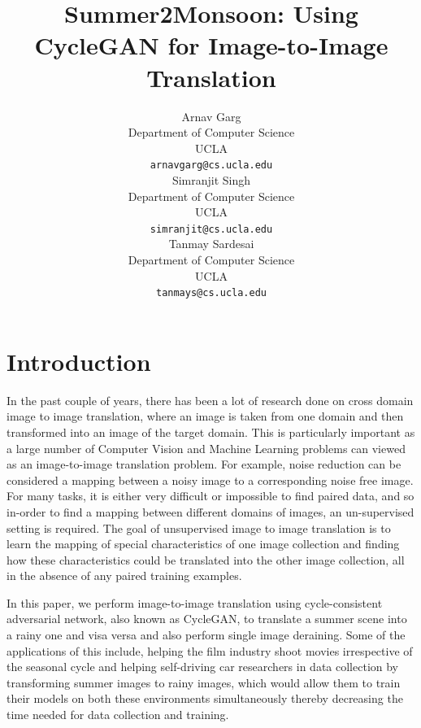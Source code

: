 \documentclass{article}
\title{Summer2Monsoon: Using CycleGAN for Image-to-Image Translation}
\author{
  Arnav Garg \\
  Department of Computer Science\\
  UCLA\\
  \texttt{arnavgarg@cs.ucla.edu} \\
  \And
  Simranjit Singh \\
  Department of Computer Science\\
  UCLA\\
  \texttt{simranjit@cs.ucla.edu} \\
   \And
  Tanmay Sardesai \\
  Department of Computer Science\\
  UCLA\\
  \texttt{tanmays@cs.ucla.edu} \\
}
\begin{document}

\maketitle

\begin{abstract}
 


\end{abstract}

\section{Introduction}

In the past couple of years, there has been a lot of research done on cross domain image to image translation, where an image is taken from one domain and then transformed into an image of the target domain. This is particularly important as a large number of Computer Vision and Machine Learning problems can viewed as an image-to-image translation problem. For example, noise reduction can be considered a mapping between a noisy image to a corresponding noise free image. For many tasks, it is either very difficult or impossible to find paired data, and so in-order to find a mapping between different domains of images, an un-supervised setting is required. The goal of unsupervised image to image translation is to learn the mapping of special characteristics of one image collection and finding how these characteristics could be translated into the other image collection, all in the absence of any paired training examples.

In this paper, we  perform image-to-image translation using cycle-consistent adversarial network, also known as CycleGAN,  to translate a summer scene into a rainy one and visa versa and also perform single image deraining. Some of the applications of this include, helping the film industry shoot movies irrespective of the seasonal cycle and helping self-driving car researchers in data collection by transforming summer images to rainy images, which would allow them to train their models on both these environments simultaneously thereby decreasing the time needed for data collection and training.
\end{document}

